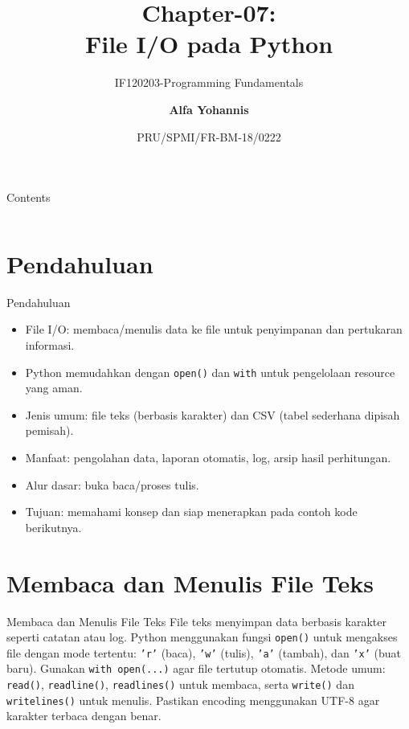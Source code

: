 \documentclass[aspectratio=169, table]{beamer}
\subtitle{IF120203-Programming Fundamentals}
\title{Chapter-07:\\\LARGE{File I/O pada Python\\}
\vspace{10pt}}
\date[Serial]{\scriptsize {PRU/SPMI/FR-BM-18/0222}}
\author[Pradita]{\small{\textbf{Alfa Yohannis}}}
\begin{document}
\frame{\titlepage}

\begin{frame}[fragile]{Contents}
\vspace{15pt}
\begin{columns}[t]
\begin{column}{.4\textwidth}
\tableofcontents[sections={1-4}]
\end{column}
\begin{column}{.6\textwidth}
\tableofcontents[sections={5-7}]
\end{column}
\end{columns}
\end{frame}


\section{Pendahuluan}
\begin{frame}{Pendahuluan}
\vspace{20pt}
\begin{itemize}
  \item File I/O: membaca/menulis data ke file untuk penyimpanan dan pertukaran informasi.
  \item Python memudahkan dengan \texttt{open()} dan \texttt{with} untuk pengelolaan resource yang aman.
  \item Jenis umum: file teks (berbasis karakter) dan CSV (tabel sederhana dipisah pemisah).
  \item Manfaat: pengolahan data, laporan otomatis, log, arsip hasil perhitungan.
  \item Alur dasar: buka \textrightarrow{} baca/proses \textrightarrow{} tulis.
  \item Tujuan: memahami konsep dan siap menerapkan pada contoh kode berikutnya.
\end{itemize}
\end{frame}

\section{Membaca dan Menulis File Teks}

\begin{frame}{Membaca dan Menulis File Teks}
\vspace{20pt}
File teks menyimpan data berbasis karakter seperti catatan atau log.  
Python menggunakan fungsi \texttt{open()} untuk mengakses file dengan mode tertentu:  
\texttt{'r'} (baca), \texttt{'w'} (tulis), \texttt{'a'} (tambah), dan \texttt{'x'} (buat baru).  
Gunakan \texttt{with open(...)} agar file tertutup otomatis.  
Metode umum: \texttt{read()}, \texttt{readline()}, \texttt{readlines()} untuk membaca,  
serta \texttt{write()} dan \texttt{writelines()} untuk menulis.  
Pastikan encoding menggunakan UTF-8 agar karakter terbaca dengan benar.
\end{frame}
\end{document}
